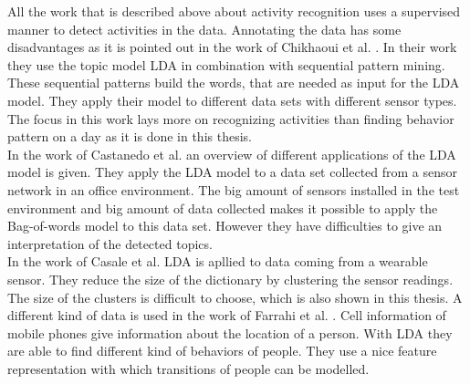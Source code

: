 \documentclass[11pt,a4paper]{article}
\begin{document}
All the work that is described above about activity recognition uses a supervised manner to detect activities in the data. Annotating the data has some disadvantages as it is pointed out in the work of Chikhaoui et al. \cite{journals/percom/ChikhaouiWP12}. In their work they use the topic model LDA in combination with sequential pattern mining. These sequential patterns build the words, that are needed as input for the LDA model. They apply their model to different data sets with different sensor types. The focus in this work lays more on recognizing activities than finding behavior pattern on a day as it is done in this thesis.\\
In the work of Castanedo et al. \cite{EXSY:EXSY12033} an overview of different applications of the LDA model is given. They apply the LDA model to a data set collected from a sensor network in an office environment. The big amount of sensors installed in the test environment and big amount of data collected makes it possible to apply the Bag-of-words model to this data set. However they have difficulties to give an interpretation of the detected topics.\\
In the work of Casale et al. \cite{Casale:2009} LDA is apllied to data coming from a wearable sensor. They reduce the size of the dictionary by clustering the sensor readings. The size of the clusters is difficult to choose, which is also shown in this thesis.
A different kind of data is used in the work of Farrahi et al. \cite{farrahi2008daily}. Cell information of mobile phones give information about the location of a person. With LDA they are able to find different kind of behaviors of people. They use a nice feature representation with which transitions of people can be modelled.



% 
% 
% 
% 
\end{document}
